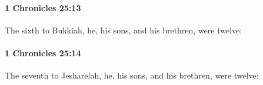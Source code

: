 		\paragraph{1 Chronicles 25:13} %
			\label{1CHRONICLES-25-13}

			The sixth to Bukkiah, he, his sons, and his brethren, were twelve:


		\paragraph{1 Chronicles 25:14} %
			\label{1CHRONICLES-25-14}

			The seventh to Jesharelah, he, his sons, and his brethren, were twelve:


